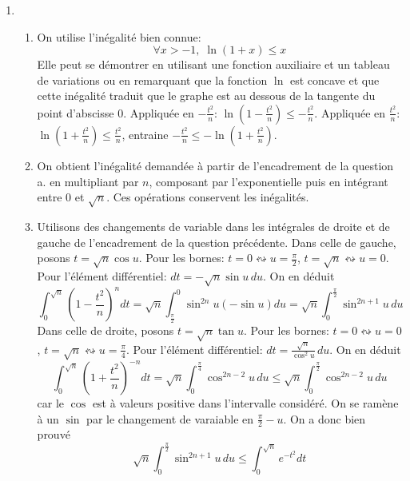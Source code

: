 \begin{enumerate}
 \item
\begin{enumerate}
 \item On utilise l'inégalité bien connue:
\begin{displaymath}
 \forall x>-1,\; \ln(1+x)\leq x
\end{displaymath}
Elle peut se démontrer en utilisant une fonction auxiliaire et un tableau de variations ou en remarquant que la fonction $\ln$ est concave et que cette inégalité traduit que le graphe est au dessous de la tangente du point d'abscisse $0$.\newline
Appliquée en $-\frac{t^2}{n}$: $\ln(1-\frac{t^2}{n})\leq -\frac{t^2}{n}$.\newline
Appliquée en $\frac{t^2}{n}$: $\ln(1+\frac{t^2}{n})\leq \frac{t^2}{n}$, entraine $ -\frac{t^2}{n}\leq -\ln(1+\frac{t^2}{n})$.
 \item On obtient  l'inégalité demandée à partir de l'encadrement de la question a. en multipliant par $n$, composant par l'exponentielle puis en intégrant entre $0$ et $\sqrt{n}$. Ces opérations conservent les inégalités.
 \item Utilisons des changements de variable dans les intégrales de droite et de gauche de l'encadrement de la question précédente.\newline
Dans celle de gauche, posons $t=\sqrt{n}\cos u$. Pour les bornes: $t=0 \leftrightsquigarrow u=\frac{\pi}{2}$, $t=\sqrt{n}\leftrightsquigarrow u= 0$. Pour l'élément différentiel: $dt=-\sqrt{n}\sin u\, du$. On en déduit
\begin{displaymath}
 \int_0^{\sqrt{n}}(1-\frac{t^2}{n})^ndt = \sqrt{n}\int_{\frac{\pi}{2}}^{0}\sin^{2n}u(-\sin u)du 
= \sqrt{n}\int_0^{\frac{\pi}{2}}\sin^{2n+1}u\,du
\end{displaymath}
Dans celle de droite, posons $t=\sqrt{n}\tan u$. Pour les bornes: $t=0 \leftrightsquigarrow u=0$, $t=\sqrt{n}\leftrightsquigarrow u= \frac{\pi}{4}$. Pour l'élément différentiel: $dt=\frac{\sqrt{n}}{\cos^2 u}\, du$. On en déduit
\begin{displaymath}
 \int_0^{\sqrt{n}}(1+\frac{t^2}{n})^{-n}dt = \sqrt{n}\int_0^{\frac{\pi}{4}}\cos^{2n-2}u\,du
\leq  \sqrt{n}\int_0^{\frac{\pi}{2}}\cos^{2n-2}u\,du
\end{displaymath}
car le $\cos$ est à valeurs positive dans l'intervalle considéré. On se ramène à un $\sin$ par le changement de varaiable en $\frac{\pi}{2}-u$. On a donc bien prouvé
\begin{displaymath}
 \sqrt{n}\int_0^{\frac{\pi}{2}}\sin^{2n+1}u\,du \leq \int_0^{\sqrt{n}}e^{-t^2}dt

\end{displaymath}
\end{enumerate}
\end{enumerate}

